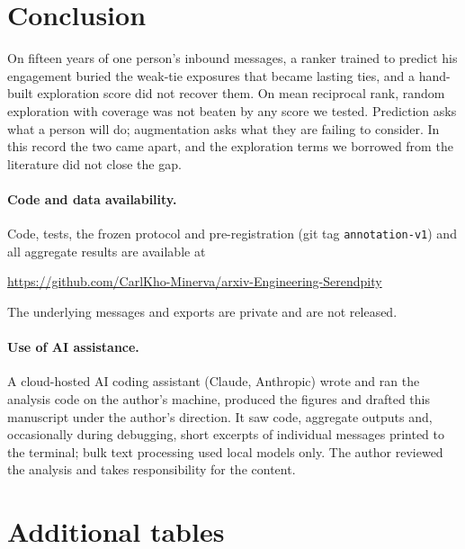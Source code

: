 \documentclass[11pt]{article}
\begin{document}
\section{Conclusion}

On fifteen years of one person's inbound messages, a ranker trained to predict his engagement buried the weak-tie exposures that became lasting ties, and a hand-built exploration score did not recover them. On mean reciprocal rank, random exploration with coverage was not beaten by any score we tested. Prediction asks what a person will do; augmentation asks what they are failing to consider. In this record the two came apart, and the exploration terms we borrowed from the literature did not close the gap.

\paragraph{Code and data availability.} Code, tests, the frozen protocol and pre-registration (git tag \texttt{annotation-v1}) and all aggregate results are available at
\begin{center}\url{https://github.com/CarlKho-Minerva/arxiv-Engineering-Serendpity}\end{center}
The underlying messages and exports are private and are not released.

\paragraph{Use of AI assistance.} A cloud-hosted AI coding assistant (Claude, Anthropic) wrote and ran the analysis code on the author's machine, produced the figures and drafted this manuscript under the author's direction. It saw code, aggregate outputs and, occasionally during debugging, short excerpts of individual messages printed to the terminal; bulk text processing used local models only. The author reviewed the analysis and takes responsibility for the content.




\appendix
\section{Additional tables}

\begin{table}[h]
\centering
\small

\caption{As Table~\ref{tab:policies}, secondary pool (automated messages kept). Test: \nSTeExp{} exposures over \nSTeWeeks{} weeks; \nSTeScored{} scored weeks with \nSTeScoredExp{} exposures, \nSTePos{} later-lasting (median \nSTeMedian{}). Validation: \nSVaExp{} exposures; \nSVaScored{} scored weeks with \nSVaScoredExp{} exposures, \nSVaPos{} later-lasting (median \nSVaMedian{}).}
\label{tab:policies2}
\end{table}
\end{document}
